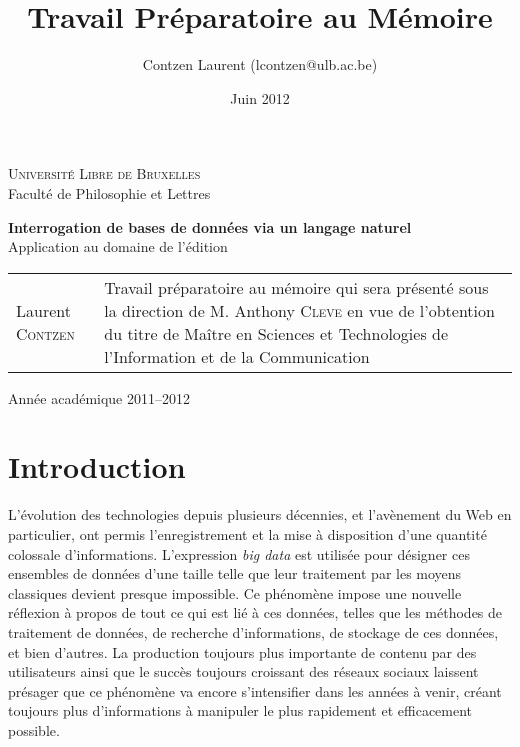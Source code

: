 \documentclass[a4paper,12pt]{article}
\title{Travail Préparatoire au Mémoire}
\date{Juin 2012}
\author{Contzen Laurent (lcontzen@ulb.ac.be)}
\begin{document}
\begin{titlepage}
  \singlespacing
  \begin{center}
    \huge{\textsc{Université Libre de Bruxelles}}\\
    \huge{Faculté de Philosophie et Lettres}
  \end{center}
  \vfill
  \begin{center}
    \Huge{\textbf{Interrogation de bases de données via un langage naturel}}\\
    \LARGE{Application au domaine de l'édition}
  \end{center}
  \vfill
  \begin{tabular}{b{5.5cm}b{7.5cm}}
    Laurent \textsc{Contzen} & Travail préparatoire au mémoire qui sera présenté sous la direction de M. Anthony \textsc{Cleve} en vue de l'obtention du titre de Maître en Sciences et Technologies de \mbox{l'Information} et de la Communication\\
  \end{tabular}
  \vfill
  \begin{center}
    Année académique 2011--2012
  \end{center}
\end{titlepage}

\tableofcontents
\newpage

\section{Introduction}
L'évolution des technologies depuis plusieurs décennies, et l'avènement du Web en particulier, ont permis l'enregistrement et la mise à disposition d'une quantité colossale d'informations.
L'expression \textit{big data} est utilisée pour désigner ces ensembles de données d'une taille telle que leur traitement par les moyens classiques devient presque impossible.
Ce phénomène impose une nouvelle réflexion à propos de tout ce qui est lié à ces données, telles que les méthodes de traitement de données, de recherche d'informations, de stockage de ces données, et bien d'autres.
La production toujours plus importante de contenu par des utilisateurs ainsi que le succès toujours croissant des réseaux sociaux laissent présager que ce phénomène va encore s'intensifier dans les années à venir, créant toujours plus d'informations à manipuler le plus rapidement et efficacement possible.\\
\end{document}
